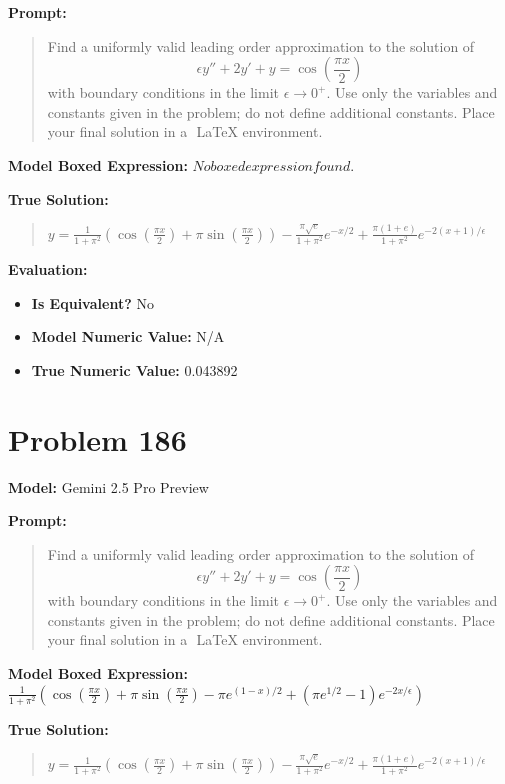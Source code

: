 \documentclass{article}
\begin{document}
{\textbf{Prompt:}
\begin{quote}
Find a uniformly valid leading order approximation to the solution of $$ \epsilon y'' + 2y' + y = \cos\left(\frac{\pi x}{2}\right)$$ with boundary conditions in the limit $\epsilon \to 0^+$. Use only the variables and constants given in the problem; do not define additional constants. Place your final solution in a $\boxed{}$ LaTeX environment.
\end{quote}
\textbf{Model Boxed Expression:} $No boxed expression found.$

\textbf{True Solution:}
\begin{quote}
$y = \frac{1}{1+\pi^2}\left(\cos\left(\frac{\pi x}{2}\right)+\pi\sin\left(\frac{\pi x}{2}\right)\right) - \frac{\pi \sqrt{e}}{1+\pi^2} e^{-x/2} + \frac{\pi(1+e)}{1+\pi^2} e^{-2(x+1)/\epsilon}$
\end{quote}

\textbf{Evaluation:}
\begin{itemize}
\item \textbf{Is Equivalent?} No
\item \textbf{Model Numeric Value:} N/A
\item \textbf{True Numeric Value:} 0.043892
\end{itemize}
\vspace{1cm}
\section*{Problem 186}
\textbf{Model:} Gemini 2.5 Pro Preview

\textbf{Prompt:}
\begin{quote}
Find a uniformly valid leading order approximation to the solution of $$ \epsilon y'' + 2y' + y = \cos\left(\frac{\pi x}{2}\right)$$ with boundary conditions in the limit $\epsilon \to 0^+$. Use only the variables and constants given in the problem; do not define additional constants. Place your final solution in a $\boxed{}$ LaTeX environment.
\end{quote}
\textbf{Model Boxed Expression:} $\frac{1}{1+\pi^2}\left(\cos\left(\frac{\pi x}{2}\right) + \pi \sin\left(\frac{\pi x}{2}\right) - \pi e^{(1-x)/2} + (\pi e^{1/2}-1)e^{-2x/\epsilon}\right)$

\textbf{True Solution:}
\begin{quote}
$y = \frac{1}{1+\pi^2}\left(\cos\left(\frac{\pi x}{2}\right)+\pi\sin\left(\frac{\pi x}{2}\right)\right) - \frac{\pi \sqrt{e}}{1+\pi^2} e^{-x/2} + \frac{\pi(1+e)}{1+\pi^2} e^{-2(x+1)/\epsilon}$
\end{quote}

}
\end{document}
